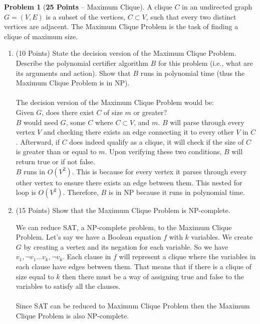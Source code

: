 \documentclass[11pt]{article}
\theoremstyle{definition}
\theoremstyle{theorem}
\newtheorem{prob}{Problem}
\begin{document}
\clearpage
\begin{prob}[\textbf{25 Points} -- Maximum Clique]
    A clique $C$ in an undirected graph $G = (V, E)$ is a subset of the vertices,
$C \subset V$, such that every two distinct vertices are adjacent. The Maximum
Clique Problem is the task of finding a clique of maximum size.
\begin{enumerate}
\item (10 Points) State the decision version of the Maximum Clique Problem. Describe the polynomial certifier algorithm $B$ for this problem (i.e., what are its arguments and action). Show that $B$ runs in polynomial time (thus the Maximum Clique Problem is in NP). \\\\
The decision version of the Maximum Clique Problem would be: \\
Given $G$, does there exist $C$ of size $m$ or greater? \\
$B$ would need $G$, some $C$ where $C \subset V$, and $m$.
$B$ will parse through every vertex $V$ and checking there exists an edge connecting it to every other $V$ in $C$. Afterward, if $C$ does indeed qualify as a clique, it will check if the size of $C$ is greater than or equal to $m$. Upon verifying these two conditions, $B$ will return true or if not false. \\
$B$ runs in $O(V^{2})$. This is because for every vertex it parses through every other vertex to ensure there exists an edge between them. This nested for loop is $O(V^{2})$. Therefore, $B$ is in NP because it runs in polynomial time.

\item (15 Points) Show that the Maximum Clique Problem is NP-complete.

We can reduce SAT, a NP-complete problem, to the Maximum Clique Problem. Let's say we have a Boolean equation $f$ with $k$ variables. We create $G$ by creating a vertex and its negation for each variable. So we have $v_{1}, \lnot v_{1} \ldots v_{k}, \lnot v_{k}$. Each clause in $f$ will represent a clique where the variables in each clause have edges between them. That means that if there is a clique of size equal to $k$ then there must be a way of assigning true and false to the variables to satisfy all the clauses. \\\\
Since SAT can be reduced to Maximum Clique Problem then the Maximum Clique Problem is also NP-complete.
\end{enumerate}
\end{prob}
\end{document}
